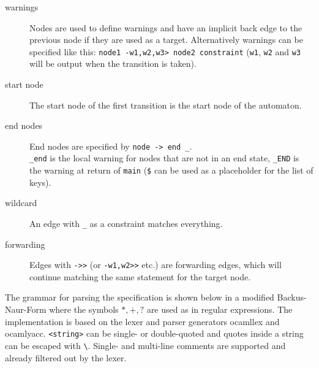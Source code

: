 \begin{description}
\item[warnings]
Nodes are used to define warnings and have an implicit back edge to the previous node if they are used as a target.
Alternatively warnings can be specified like this: \verb|node1 -w1,w2,w3> node2 constraint| (\verb|w1|, \verb|w2| and \verb|w3| will be output when the transition is taken).

\item[start node]
The start node of the first transition is the start node of the automaton.

\item[end nodes]
End nodes are specified by \verb|node -> end _|.\\
\verb|_end| is the local warning for nodes that are not in an end state, \verb|_END| is the warning at return of \verb|main| (\verb|$| can be used as a placeholder for the list of keys).

\item[wildcard]
An edge with \verb|_| as a constraint matches everything.

\item[forwarding]
Edges with \verb|->>| (or \verb|-w1,w2>>| etc.) are forwarding edges, which will continue matching the same statement for the target node.\\
\end{description}
The grammar for parsing the specification is shown below in a modified Backus-Naur-Form where the symbols $*, +, ?$ are used as in regular expressions. The implementation is based on the lexer and parser generators ocamllex and ocamlyacc. \verb|<string>| can be single- or double-quoted and quotes inside a string can be escaped with \verb|\|. Single- and multi-line comments are supported and already filtered out by the lexer.
